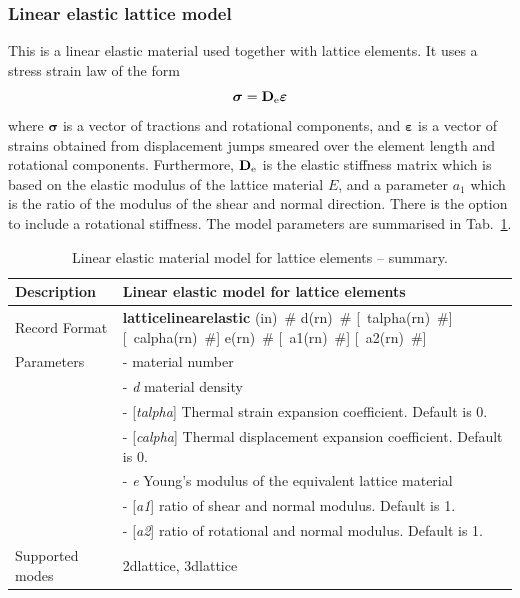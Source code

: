 \documentclass[a4paper]{article}
\newcommand{\descitem}[1]{{\noindent \bf #1}}
\newcommand{\elemparam}[2]{{{#1\tiny (#2)}~\#}}
\newcommand{\optelemparam}[2]{[{~\elemparam{#1}{#2}}]}
\newcommand{\param}[1]{{\it #1}}
\newcommand{\optparam}[1]{[{\it #1}]}
\newenvironment{mmt}{\begin{tabular}{|l|p{9cm}|}}{\end{tabular}\\}
\newenvironment{mmt}{\begin{tabular}{|l|l|}}{\end{tabular}\\}
\begin{document}
\subsubsection{Linear elastic lattice model}
This is a linear elastic material used together with lattice elements.
It uses a stress strain law of the form
\begin{equation}
\boldsymbol{\sigma} = \mathbf{D}_{\rm e} \boldsymbol{\varepsilon}
\end{equation}
where $\boldsymbol{\sigma}$ is a vector of tractions and rotational components, and $\boldsymbol{\varepsilon}$ is a vector of strains obtained from displacement jumps smeared over the element length and rotational components.
Furthermore, $\mathbf{D}_{\rm e}$ is the elastic stiffness matrix which is based on the elastic modulus of the lattice material $E$, and a parameter $a_1$ which is the ratio of the modulus of the shear and normal direction. There is the option to include a rotational stiffness. The model parameters are summarised in Tab.~\ref{latticelinearelastic_table}.

\begin{table}[!htb]
\begin{mmt}
\hline
Description & Linear elastic model for lattice elements \\
\hline
Record Format & \descitem{latticelinearelastic} \elemparam{}{in} 
\elemparam{d}{rn} \optelemparam{talpha}{rn} \optelemparam{calpha}{rn} \elemparam{e}{rn} \optelemparam{a1}{rn} \optelemparam{a2}{rn}\\
Parameters &- \param{} material number\\
&- \param{d} material density\\
&- \optparam{talpha} Thermal strain expansion coefficient. Default is 0.\\
&- \optparam{calpha} Thermal displacement expansion coefficient. Default is 0.\\
&- \param{e} Young's modulus of the equivalent lattice material\\
&- \optparam{a1} ratio of shear and normal modulus. Default is 1.\\
&- \optparam{a2} ratio of rotational and normal modulus. Default is 1.\\
Supported modes & 2dlattice, 3dlattice\\
\hline
\end{mmt}
\caption{Linear elastic material model for lattice elements -- summary.}
\label{latticelinearelastic_table}
\end{table}
\end{document}
